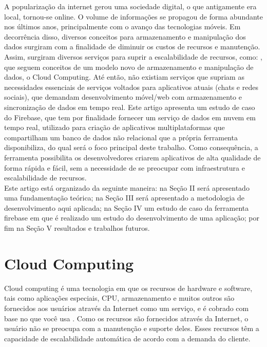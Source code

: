 \documentclass[12pt]{article}
\begin{document}
A popularização da internet gerou uma sociedade digital, o que antigamente era local, tornou-se online. O volume de informações se propagou de forma abundante nos últimos anos, principalmente com o avanço das tecnologias móveis. Em decorrência disso, diversos conceitos para armazenamento e manipulação dos dados surgiram com a finalidade de diminuir os custos de recursos e manutenção. Assim, surgiram diversos serviços para suprir a escalabilidade de recursos, como: \cite{WA} \cite{GAE} \cite{AWS}, que seguem conceitos de um modelo novo de armazenamento e manipulação de dados, o Cloud Computing. Até então, não existiam serviços que supriam as necessidades essenciais de serviços voltados para aplicativos atuais (chats e redes sociais), que demandam desenvolvimento móvel/web com armazenamento e sincronização de dados em tempo real. Este artigo apresenta um estudo de caso do Firebase, que tem por finalidade fornecer um serviço de dados em nuvem em tempo real, utilizado para criação de aplicativos multiplataformas que compartilham um banco de dados não relacional que a própria ferramenta disponibiliza, do qual será o foco principal deste trabalho. Como consequência, a ferramenta possibilita os desenvolvedores criarem aplicativos de alta qualidade de forma rápida e fácil, sem a necessidade de se preocupar com infraestrutura e escalabilidade de recursos.
\\
Este artigo está organizado da seguinte maneira: na Seção II será apresentado uma fundamentação teórica; na Seção III será apresentado a metodologia de desenvolvimento aqui aplicada; na Seção IV um estudo de caso da ferramenta firebase em que é realizado um estudo do desenvolvimento de uma aplicação; por fim na Seção V resultados e trabalhos futuros.

\section{Cloud Computing} \label{sec:firstpage}

Cloud computing é uma tecnologia em que os recursos de hardware e software, tais como aplicações especiais, CPU, armazenamento e muitos outros são fornecidos aos usuários através da Internet como um serviço, e é cobrado com base no que você usa \cite{1}. Como os recursos são fornecidos através da Internet, o usuário não se preocupa com a manutenção e suporte deles. Esses recursos têm a capacidade de escalabilidade automática de acordo com a demanda do cliente. 
\end{document}
